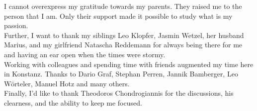 I cannot overexpress my gratitude towards my parents.
They raised me to the person that I am.
Only their support made it possible to study what is my passion. \\

Further, I want to thank my siblings Leo Klopfer, Jasmin Wetzel, her husband Marius, and my girlfriend Natascha Reddemann for always being there for me and having an ear open when the times were stormy. \\

Working with colleagues and spending time with friends augmented my time here in Konstanz. Thanks to Dario Graf, Stephan Perren, Jannik Bamberger, Leo Wörteler, Manuel Hotz and many others. \\

Finally, I'd like to thank Theodoros Chondrogiannis for the discussions, his clearness, and the ability to keep me focused. 
\vfill\hspace{0pt}
\newpage
